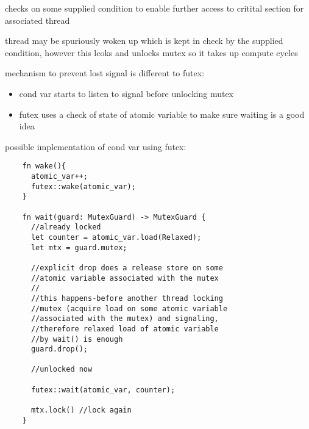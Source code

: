 \documentclass[8pt]{extarticle}
\begin{document}
\begin{multicols*}{2}
    checks on some supplied condition to enable further access to critital section for associated thread

    thread may be spuriously woken up which is kept in check by the supplied condition, however this lcoks and unlocks mutex so it takes up compute cycles

    mechanism to prevent lost signal is different to futex:
    \begin{itemize}
    \item cond var starts to listen to signal before unlocking mutex
    \item futex uses a check of state of atomic variable to make sure waiting is a good idea
    \end{itemize}

    possible implementation of cond var using futex:

    \begin{verbatim}
    fn wake(){
      atomic_var++;
      futex::wake(atomic_var);
    }

    fn wait(guard: MutexGuard) -> MutexGuard {
      //already locked
      let counter = atomic_var.load(Relaxed);
      let mtx = guard.mutex;

      //explicit drop does a release store on some
      //atomic variable associated with the mutex
      //
      //this happens-before another thread locking
      //mutex (acquire load on some atomic variable
      //associated with the mutex) and signaling,
      //therefore relaxed load of atomic variable
      //by wait() is enough
      guard.drop();

      //unlocked now

      futex::wait(atomic_var, counter);

      mtx.lock() //lock again
    }
    \end{verbatim}


\end{multicols*}
\end{document}
